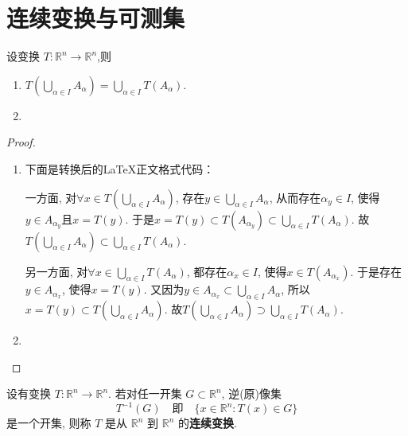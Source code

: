 \documentclass[../../main.tex]{subfiles}
\begin{document}
\section{连续变换与可测集}

\begin{theorem}[变换的基本性质]\label{theorem:变换的基本性质}
设变换 $T:\mathbb{R}^n\to\mathbb{R}^n$,则
\begin{enumerate}
\item $T\left( \bigcup_{\alpha \in I}{A_{\alpha}} \right) =\bigcup_{\alpha \in I}{T\left( A_{\alpha} \right)}$.

\item 
\end{enumerate}
\end{theorem}
\begin{proof}
\begin{enumerate}
\item 下面是转换后的LaTeX正文格式代码：

一方面, 对$\forall x\in T\left( \bigcup_{\alpha \in I}{A_{\alpha}} \right)$, 存在$y\in \bigcup_{\alpha \in I}{A_{\alpha}}$, 从而存在$\alpha _y\in I$, 使得$y\in A_{\alpha _y}$且$x=T\left( y \right)$. 于是$x=T\left( y \right) \subset T\left( A_{\alpha _y} \right) \subset \bigcup_{\alpha \in I}{T\left( A_{\alpha} \right)}$. 故$T\left( \bigcup_{\alpha \in I}{A_{\alpha}} \right) \subset \bigcup_{\alpha \in I}{T\left( A_{\alpha} \right)}$.

另一方面, 对$\forall x\in \bigcup_{\alpha \in I}{T\left( A_{\alpha} \right)}$, 都存在$\alpha _x\in I$, 使得$x\in T\left( A_{\alpha _x} \right)$. 于是存在$y\in A_{\alpha _x}$, 使得$x=T\left( y \right)$. 又因为$y\in A_{\alpha _x}\subset \bigcup_{\alpha \in I}{A_{\alpha}}$, 所以$x=T\left( y \right) \subset T\left( \bigcup_{\alpha \in I}{A_{\alpha}} \right)$. 故$T\left( \bigcup_{\alpha \in I}{A_{\alpha}} \right) \supset \bigcup_{\alpha \in I}{T\left( A_{\alpha} \right)}$.

\item 
\end{enumerate}
\end{proof}

\begin{definition}[连续变换]
设有变换 $T:\mathbb{R}^n\to\mathbb{R}^n$. 若对任一开集 $G\subset\mathbb{R}^n$, 逆(原)像集
\[
T^{-1}(G)\quad \text{即}\quad \{x\in\mathbb{R}^n:T(x)\in G\}
\]
是一个开集, 则称 $T$ 是从 $\mathbb{R}^n$ 到 $\mathbb{R}^n$ 的\textbf{连续变换}.
\end{definition}
\end{document}
